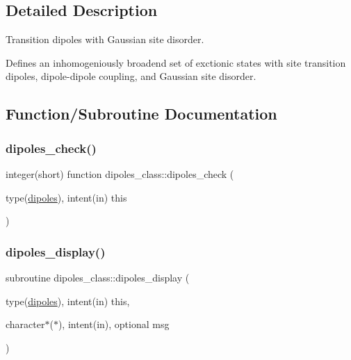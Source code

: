 \subsection{Detailed Description}
Transition dipoles with Gaussian site disorder. 

Defines an inhomogeniously broadend set of exctionic states with site transition dipoles, dipole-\/dipole coupling, and Gaussian site disorder. 

\subsection{Function/\+Subroutine Documentation}
\mbox{\label{namespacedipoles__class_acf34b0d8a2cae92c5b35a03eb9c0237b}} 
\subsubsection{\texorpdfstring{dipoles\+\_\+check()}{dipoles\_check()}}
{\footnotesize\ttfamily integer(short) function dipoles\+\_\+class\+::dipoles\+\_\+check (\begin{DoxyParamCaption}\item[{type(\hyperlink{structdipoles__class_1_1dipoles}{dipoles}), intent(in)}]{this }\end{DoxyParamCaption})\hspace{0.3cm}{\ttfamily [private]}}

\mbox{\label{namespacedipoles__class_a732ca8b1573dd77731c6272ce551bc70}} 
\subsubsection{\texorpdfstring{dipoles\+\_\+display()}{dipoles\_display()}}
{\footnotesize\ttfamily subroutine dipoles\+\_\+class\+::dipoles\+\_\+display (\begin{DoxyParamCaption}\item[{type(\hyperlink{structdipoles__class_1_1dipoles}{dipoles}), intent(in)}]{this,  }\item[{character$\ast$($\ast$), intent(in), optional}]{msg }\end{DoxyParamCaption})\hspace{0.3cm}{\ttfamily [private]}}

